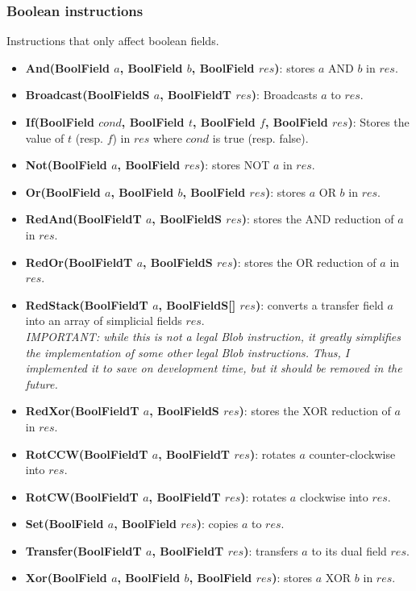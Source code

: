\documentclass[11pt,a4paper]{report}
\begin{document}
\subsubsection{Boolean instructions}
Instructions that only affect boolean fields.
\begin{itemize}
	\item \textbf{And(BoolField $a$, BoolField $b$, BoolField $res$)}: stores $a$ AND $b$ in $res$.
	\item \textbf{Broadcast(BoolFieldS $a$, BoolFieldT $res$)}: Broadcasts $a$ to $res$.
	\item \textbf{If(BoolField $cond$, BoolField $t$, BoolField $f$, BoolField $res$)}: Stores the value of $t$ (resp. $f$) in $res$ where $cond$ is true (resp. false).
	\item \textbf{Not(BoolField $a$, BoolField $res$)}: stores NOT $a$ in $res$.
    \item \textbf{Or(BoolField $a$, BoolField $b$, BoolField $res$)}: stores $a$ OR $b$ in $res$.
    \item \textbf{RedAnd(BoolFieldT $a$, BoolFieldS $res$)}: stores the AND reduction of $a$ in $res$.
    \item \textbf{RedOr(BoolFieldT $a$, BoolFieldS $res$)}: stores the OR reduction of $a$ in $res$.
    \item \textbf{RedStack(BoolFieldT $a$, BoolFieldS[] $res$)}: converts a transfer field $a$ into an array of simplicial fields $res$.\\
    \textit{IMPORTANT: while this is not a legal Blob instruction, it greatly simplifies the implementation of some other legal Blob instructions. Thus, I implemented it to save on development time, but it should be removed in the future.}
    \item \textbf{RedXor(BoolFieldT $a$, BoolFieldS $res$)}: stores the XOR reduction of $a$ in $res$.
    \item \textbf{RotCCW(BoolFieldT $a$, BoolFieldT $res$)}: rotates $a$ counter-clockwise into $res$.
    \item \textbf{RotCW(BoolFieldT $a$, BoolFieldT $res$)}: rotates $a$ clockwise into $res$.
    \item \textbf{Set(BoolField $a$, BoolField $res$)}: copies $a$ to $res$.
    \item \textbf{Transfer(BoolFieldT $a$, BoolFieldT $res$)}: transfers $a$ to its dual field $res$.
    \item \textbf{Xor(BoolField $a$, BoolField $b$, BoolField $res$)}: stores $a$ XOR $b$ in $res$.
\end{itemize}
\end{document}
